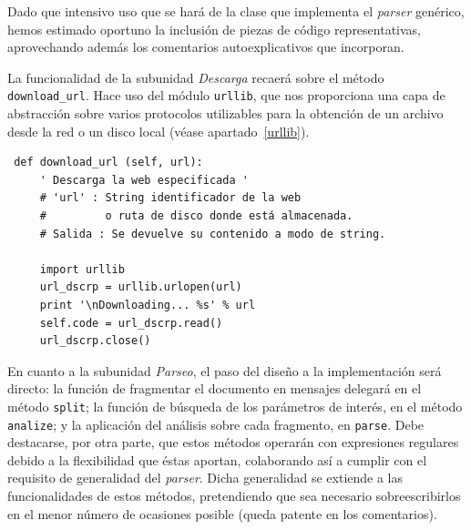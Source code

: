 Dado que intensivo uso que se hará de la clase que implementa el \textit{parser}
genérico, hemos estimado oportuno la inclusión de piezas de código representativas,
aprovechando además los comentarios autoexplicativos que incorporan.

La funcionalidad de la subunidad \textit{Descarga} recaerá sobre el método
\texttt{download\_url}. Hace uso del módulo \texttt{urllib}, que nos proporciona
una capa de abstracción sobre varios protocolos utilizables para la obtención
de un archivo desde la red o un disco local (véase apartado~\ref{urllib}).

{\footnotesize
\begin{verbatim}
 def download_url (self, url):
     ' Descarga la web especificada '
     # 'url' : String identificador de la web
     #         o ruta de disco donde está almacenada.
     # Salida : Se devuelve su contenido a modo de string.
     
     import urllib
     url_dscrp = urllib.urlopen(url)
     print '\nDownloading... %s' % url
     self.code = url_dscrp.read()
     url_dscrp.close()
\end{verbatim}
}

En cuanto a la subunidad \textit{Parseo}, el paso del diseño a la implementación
será directo: la función de fragmentar el documento en mensajes delegará en el método
\texttt{split}; la función de búsqueda de los parámetros de interés, en el método
\texttt{analize}; y la aplicación del análisis sobre cada fragmento, en
\texttt{parse}. Debe destacarse, por otra parte, que estos métodos operarán
con expresiones regulares debido a la flexibilidad que éstas aportan,
colaborando así a cumplir con el requisito de generalidad del \textit{parser}.
Dicha generalidad se extiende a las funcionalidades de estos métodos,
pretendiendo que sea necesario sobreescribirlos en el menor número de ocasiones
posible (queda patente en los comentarios).

